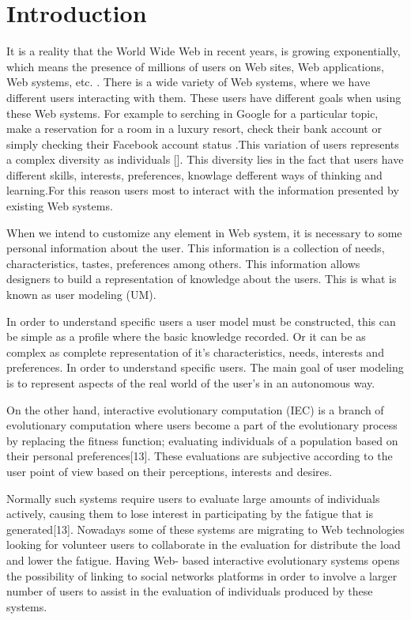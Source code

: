 \chapter{Introduction} \label{introduction} 


\par It is a reality that the World Wide Web in recent years, is growing
exponentially, which means the presence of millions of users on Web sites, Web
applications, Web systems, etc. \cite{albert1999internet}. There is a wide variety of Web systems,
where we have different users interacting with them. These users have different
goals when using these Web systems. For example to serching  in Google
\cite{google} for a particular topic, make a reservation for a room in a luxury
resort, check their bank account or simply checking their Facebook account
status \cite{cockburn2001web}.This variation of users represents a complex diversity as individuals
[]. This diversity lies in the fact that users have different skills, interests,
preferences, knowlage defferent  ways of thinking and learning.For this
reason users most to interact with the information presented by existing Web
systems. \par When we intend to customize any element in Web system,  it is
necessary to some personal information about the user. This information is a
collection of needs, characteristics, tastes, preferences among others.  This
information allows designers to build a representation of knowledge about the
users. This is what is known as user modeling (UM).    
\par  In order to
understand specific users a user model must be constructed, this can be simple
as a profile where the basic knowledge recorded. Or it can be as complex as
complete representation of it's characteristics, needs, interests and
preferences. In order to understand specific users. The main goal of user
modeling is to represent aspects of the real world of the user's in an autonomous
way.

\par On the other hand, interactive evolutionary computation (IEC)
is a branch of evolutionary computation where users become a part of the
evolutionary process by replacing the fitness function; evaluating individuals
of a population based on their personal preferences[13]. These evaluations are
subjective according to the user point of view based on their perceptions,
interests and desires.  
\par Normally such systems require users to evaluate large amounts of individuals 
actively, causing them to lose interest in participating by the fatigue that 
is generated[13]. Nowadays some of these systems
are migrating to  Web technologies looking for volunteer users to collaborate
in the evaluation for distribute the load and lower the fatigue. Having Web-
based interactive evolutionary systems opens the possibility of linking to social networks 
platforms in order to involve a larger number of users to assist in
the evaluation of individuals produced by these systems.

